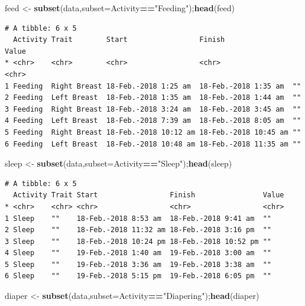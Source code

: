 \documentclass[10,portrait]{article}
\newenvironment{Shaded}{\begin{snugshade}}{\end{snugshade}}
\newcommand{\KeywordTok}[1]{\textcolor[rgb]{0.13,0.29,0.53}{\textbf{#1}}}
\newcommand{\DataTypeTok}[1]{\textcolor[rgb]{0.13,0.29,0.53}{#1}}
\newcommand{\StringTok}[1]{\textcolor[rgb]{0.31,0.60,0.02}{#1}}
\newcommand{\OperatorTok}[1]{\textcolor[rgb]{0.81,0.36,0.00}{\textbf{#1}}}
\newcommand{\NormalTok}[1]{#1}
\begin{document}
\begin{Shaded}
\begin{Highlighting}[]
\NormalTok{feed <-}\StringTok{ }\KeywordTok{subset}\NormalTok{(data,}\DataTypeTok{subset=}\NormalTok{Activity}\OperatorTok{==}\StringTok{"Feeding"}\NormalTok{);}\KeywordTok{head}\NormalTok{(feed)}
\end{Highlighting}
\end{Shaded}

\begin{verbatim}
# A tibble: 6 x 5
  Activity Trait        Start                 Finish                Value
* <chr>    <chr>        <chr>                 <chr>                 <chr>
1 Feeding  Right Breast 18-Feb.-2018 1:25 am  18-Feb.-2018 1:35 am  ""   
2 Feeding  Left Breast  18-Feb.-2018 1:35 am  18-Feb.-2018 1:44 am  ""   
3 Feeding  Right Breast 18-Feb.-2018 3:24 am  18-Feb.-2018 3:45 am  ""   
4 Feeding  Left Breast  18-Feb.-2018 7:39 am  18-Feb.-2018 8:05 am  ""   
5 Feeding  Right Breast 18-Feb.-2018 10:12 am 18-Feb.-2018 10:45 am ""   
6 Feeding  Left Breast  18-Feb.-2018 10:48 am 18-Feb.-2018 11:35 am ""   
\end{verbatim}

\begin{Shaded}
\begin{Highlighting}[]
\NormalTok{sleep <-}\StringTok{ }\KeywordTok{subset}\NormalTok{(data,}\DataTypeTok{subset=}\NormalTok{Activity}\OperatorTok{==}\StringTok{"Sleep"}\NormalTok{);}\KeywordTok{head}\NormalTok{(sleep)}
\end{Highlighting}
\end{Shaded}

\begin{verbatim}
# A tibble: 6 x 5
  Activity Trait Start                 Finish                Value
* <chr>    <chr> <chr>                 <chr>                 <chr>
1 Sleep    ""    18-Feb.-2018 8:53 am  18-Feb.-2018 9:41 am  ""   
2 Sleep    ""    18-Feb.-2018 11:32 am 18-Feb.-2018 3:16 pm  ""   
3 Sleep    ""    18-Feb.-2018 10:24 pm 18-Feb.-2018 10:52 pm ""   
4 Sleep    ""    19-Feb.-2018 1:40 am  19-Feb.-2018 3:00 am  ""   
5 Sleep    ""    19-Feb.-2018 3:36 am  19-Feb.-2018 3:38 am  ""   
6 Sleep    ""    19-Feb.-2018 5:15 pm  19-Feb.-2018 6:05 pm  ""   
\end{verbatim}

\begin{Shaded}
\begin{Highlighting}[]
\NormalTok{diaper <-}\StringTok{ }\KeywordTok{subset}\NormalTok{(data,}\DataTypeTok{subset=}\NormalTok{Activity}\OperatorTok{==}\StringTok{"Diapering"}\NormalTok{);}\KeywordTok{head}\NormalTok{(diaper)}
\end{Highlighting}
\end{Shaded}
\end{document}
